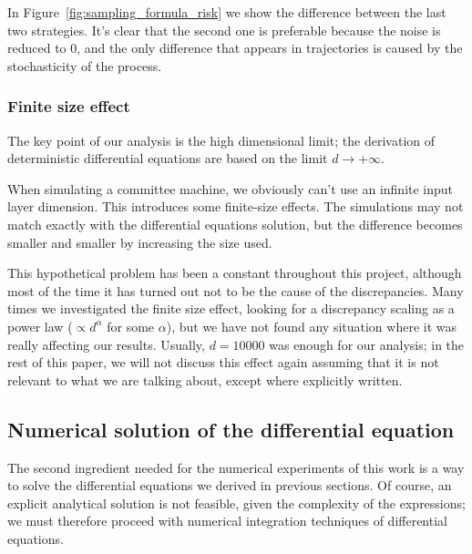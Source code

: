 In Figure~\ref{fig:sampling_formula_risk} we show the difference between the last two strategies.
It's clear that the second one is preferable because the noise is reduced to 0, and the only difference
that appears in trajectories is caused by the stochasticity of the process.

\subsubsection{Finite size effect}
The key point of our analysis is the high dimensional limit; the derivation of 
deterministic differential equations are based on the limit \(d\to+\infty\).

When simulating a committee machine, we obviously can't use an infinite input layer dimension.
This introduces some finite-size effects. The simulations may not match exactly with the 
differential equations solution, but the difference becomes smaller and smaller by 
increasing the size used. 

This hypothetical problem has been a constant throughout this project,
although most of the time it has turned out not to be the cause of the discrepancies.
Many times we investigated the finite size effect, looking for a discrepancy scaling as
a power law (\(\propto d^\alpha\) for some \(\alpha\)), but we have not found any situation where
it was really affecting our results. Usually, \(d=10000\) was enough for our analysis; 
in the rest of this paper, we will not discuss this effect again assuming that
it is not relevant to what we are talking about, except where explicitly written.



\subsection{Numerical solution of the differential equation}
The second ingredient needed for the numerical experiments of this work is a way to
solve the differential equations we derived in previous sections. Of course,
an explicit analytical solution is not feasible, given the complexity of the expressions;
we must therefore proceed with numerical integration techniques of differential equations. 

